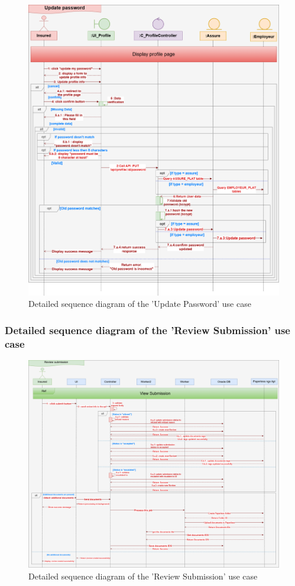 \begin{figure}[h!]
    \centering
    \includegraphics[width=1\textwidth]{figures/det update password.png}
    \caption{Detailed sequence diagram of the 'Update Password' use case}
    \label{fig:image4}
\end{figure}
\clearpage
\subsubsection{Detailed sequence diagram of the 'Review Submission' use case}
\begin{figure}[h!]
    \centering
    \includegraphics[width=1\textwidth]{figures/det review submission.png}
    \caption{Detailed sequence diagram of the 'Review Submission' use case}
    \label{fig:image4}
\end{figure}
\clearpage
